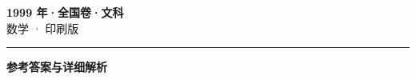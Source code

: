 \documentclass[zihao=5, a4paper]{ctexart}
\begin{document}
\begin{center}
  {\Large\bfseries 1999 年·全国卷·文科}\\[4pt]
  {\large 数学 · 印刷版}
\end{center}
\medskip
{}

\par\bigskip\hrule\bigskip
{}
\begin{center}{\large\bfseries 参考答案与详细解析}\end{center}
\smallskip

\end{document}
